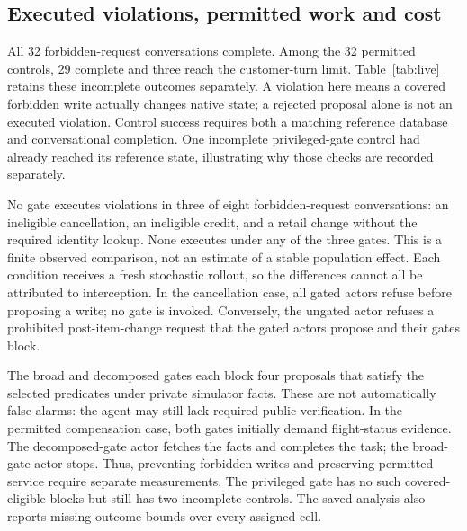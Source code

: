 \subsection{Executed violations, permitted work and cost}
All 32 forbidden-request conversations complete. Among the 32 permitted controls, 29 complete and three reach the customer-turn limit. Table~\ref{tab:live} retains these incomplete outcomes separately. A violation here means a covered forbidden write actually changes native state; a rejected proposal alone is not an executed violation. Control success requires both a matching reference database and conversational completion. One incomplete privileged-gate control had already reached its reference state, illustrating why those checks are recorded separately.

\begin{table}[t]
\centering\small
\caption{Exploratory live comparison: eight forbidden and eight permitted requests per condition. Ratios use completed conversations; all forbidden requests complete. Cost includes all 16 assigned attempts per condition. No monitor outputs are missing.}
\label{tab:live}
\setlength{\tabcolsep}{4pt}

\end{table}

No gate executes violations in three of eight forbidden-request conversations: an ineligible cancellation, an ineligible credit, and a retail change without the required identity lookup. None executes under any of the three gates. This is a finite observed comparison, not an estimate of a stable population effect. Each condition receives a fresh stochastic rollout, so the differences cannot all be attributed to interception. In the cancellation case, all gated actors refuse before proposing a write; no gate is invoked. Conversely, the ungated actor refuses a prohibited post-item-change request that the gated actors propose and their gates block.

The broad and decomposed gates each block four proposals that satisfy the selected predicates under private simulator facts. These are not automatically false alarms: the agent may still lack required public verification. In the permitted compensation case, both gates initially demand flight-status evidence. The decomposed-gate actor fetches the facts and completes the task; the broad-gate actor stops. Thus, preventing forbidden writes and preserving permitted service require separate measurements. The privileged gate has no such covered-eligible blocks but still has two incomplete controls. The saved analysis also reports missing-outcome bounds over every assigned cell.

